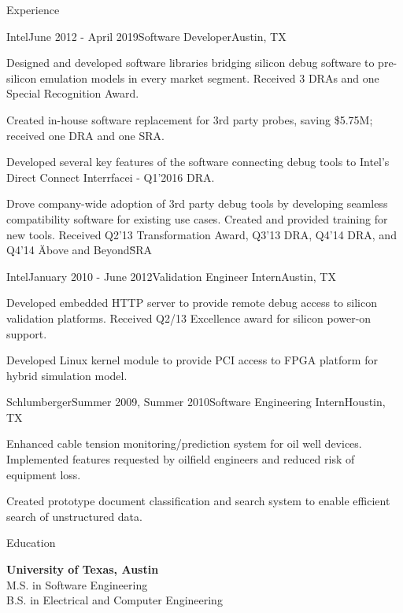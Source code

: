 \documentclass{resume} %
\begin{document}
\begin{rSection}{Experience}
\begin{rSubsection}{Intel}{June 2012 - April 2019}{Software Developer}{Austin, TX}
\item Designed and developed software libraries bridging silicon debug software to pre-silicon emulation models in every market segment. Received 3 DRAs and one Special Recognition Award.
\item Created in-house software replacement for 3rd party probes, saving \$5.75M; received one DRA and one SRA.
\item Developed several key features of the software connecting debug tools to Intel's Direct Connect Interrfacei - Q1'2016 DRA.
\item Drove company-wide adoption of 3rd party debug tools by developing seamless compatibility software for existing use cases. Created and provided training for new tools. Received Q2'13 Transformation Award, Q3'13 DRA, Q4'14 DRA, and Q4'14 \"Above and Beyond\" SRA
\end{rSubsection}


\begin{rSubsection}{Intel}{January 2010 - June 2012}{Validation Engineer Intern}{Austin, TX}
\item Developed embedded HTTP server to provide remote debug access to silicon validation platforms. Received Q2/13 Excellence award for silicon power-on support.
\item Developed Linux kernel module to provide PCI access to FPGA platform for hybrid simulation model.
\end{rSubsection}


\begin{rSubsection}{Schlumberger}{Summer 2009, Summer 2010}{Software Engineering Intern}{Houstin, TX}
\item Enhanced cable tension monitoring/prediction system for oil well devices. Implemented features requested by oilfield engineers and reduced risk of equipment loss.  
\item Created prototype document classification and search system to enable efficient search of unstructured data.
\end{rSubsection}

\end{rSection}


\begin{rSection}{Education}

{\bf University of Texas, Austin}  \\ 
M.S. in Software Engineering \\
B.S. in Electrical and Computer Engineering \\

\end{rSection}
\end{document}
